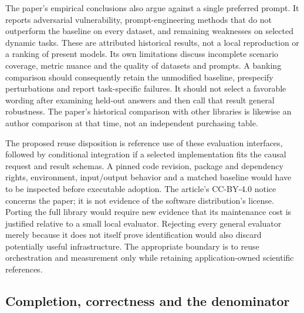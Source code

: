 The paper's empirical conclusions also argue against a single preferred
prompt. It reports adversarial vulnerability, prompt-engineering methods
that do not outperform the baseline on every dataset, and remaining
weaknesses on selected dynamic tasks. These are attributed historical
results, not a local reproduction or a ranking of present models. Its own
limitations discuss incomplete scenario coverage, metric nuance and the
quality of datasets and prompts. A banking comparison should consequently
retain the unmodified baseline, prespecify perturbations and report
task-specific failures. It should not select a favorable wording after
examining held-out answers and then call that result general robustness.
The paper's historical comparison with other libraries is likewise an
author comparison at that time, not an independent purchasing table.
\citep{exec18_framework_promptbench}

The proposed reuse disposition is reference use of these evaluation
interfaces, followed by conditional integration if a selected implementation
fits the causal request and result schemas. A pinned code revision, package
and dependency rights, environment, input/output behavior and a matched
baseline would have to be inspected before executable adoption. The
article's CC-BY-4.0 notice concerns the paper; it is not evidence of the
software distribution's license. Porting the full library would require
new evidence that its maintenance cost is justified relative to a small
local evaluator. Rejecting every general evaluator merely because it does
not itself prove identification would also discard potentially useful
infrastructure. The appropriate boundary is to reuse orchestration and
measurement only while retaining application-owned scientific references.

\subsection{Completion, correctness and the denominator}

